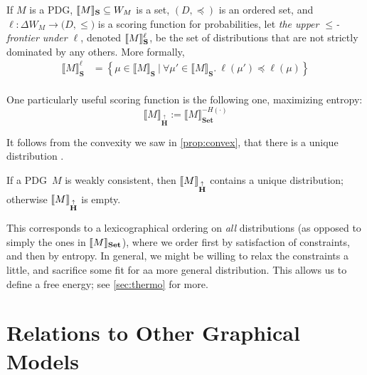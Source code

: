 \documentclass{article}
\newcommand{\MN}{PDG}%
\newcommand\Set{\textbf{Set}}
\newcommand\MaxEnt{{\overset{\uparrow}{\mathbf H}}}
\begin{document}
	\begin{defn}
		If  $M$ is a \MN, $\llbracket M\rrbracket_{\mathbf S} \subseteq W_{M}$ is a set, $(D, \preceq)$ is an ordered set, and $\ell : \Delta W_{M} \to \mathbb (D, \leq)$ is a scoring function for probabilities, let \emph{the upper $\leq$-frontier under $\ell$}, denoted $\llbracket M\rrbracket_{\mathbf S}^\ell$, be the set of distributions that are not strictly dominated by any others. More formally,
		\begin{align*}
			\llbracket M \rrbracket_{\mathbf S}^\ell &=  \left\{\mu \in \llbracket M \rrbracket_{\mathbf S} ~\Big|~ \forall \mu' \in \llbracket M \rrbracket_{\mathbf S}.~ \ell(\mu') \preceq \ell(\mu)  \right\} \\
		\end{align*}
	\end{defn}

	
	One particularly useful scoring function is the following one, maximizing entropy:
	\[ \Big\llbracket M \Big\rrbracket_\MaxEnt := \Big\llbracket M \Big\rrbracket_\Set^{-H(\cdot)} \]
	
	It follows from the convexity we saw in \cref{prop:convex}, that there is a unique distribution .
	\begin{coro} 
		If a \MN\ $M$ is weakly consistent, then $\bbr{M}_\MaxEnt$ contains a unique distribution; otherwise $\bbr{M}_\MaxEnt$ is empty.
	\end{coro}	

	
	This corresponds to a lexicographical ordering on \emph{all} distributions (as opposed to simply the ones in $\bbr{M}_\Set$), where we order first by satisfaction of constraints, and then by entropy. In general, we might be willing to relax the constraints a little, and sacrifice some fit for aa more general distribution. This allows us to define a free energy; see \cref{sec:thermo} for more.
	

	\section{Relations to Other Graphical Models}\label{sec:other-graphical-models}
	
\end{document}
